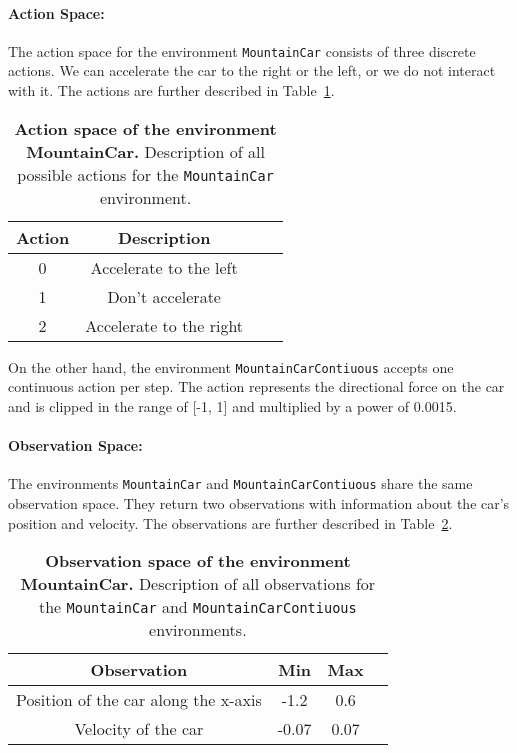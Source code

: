\paragraph*{Action Space:} The action space for the environment \verb|MountainCar| consists of three discrete actions. We can accelerate the car to the right or the left, or we do not interact with it. The actions are further described in Table~\ref{table:mountaincar_act}.
\begin{table}[!ht]
  \centering
  \begin{tabular}{ |c|c|c|c| }
    \hline
    Action & Description \\
    \hline
    0 & Accelerate to the left \\
    1 & Don't accelerate  \\
    2 & Accelerate to the right \\
    \hline
  \end{tabular}
  \caption[Action space of the environment MountainCar]{
    \textbf{Action space of the environment MountainCar.}
    Description of all possible actions for the \texttt{MountainCar} environment.
  }
  \label{table:mountaincar_act}
\end{table}
On the other hand, the environment \verb|MountainCarContiuous| accepts one continuous action per step. The action represents the directional force on the car and is clipped in the range of [-1, 1] and multiplied by a power of 0.0015.

\paragraph*{Observation Space:} The environments \verb|MountainCar| and \verb|MountainCarContiuous| share the same observation space. They return two observations with information about the car's position and velocity. The observations are further described in Table~\ref{table:mountaincar_obs}.
\begin{table}[!ht]
  \centering
  \begin{tabular}{ |c|c|c|c| }
    \hline
    Observation & Min & Max \\
    \hline
    Position of the car along the x-axis & -1.2 & 0.6 \\
    Velocity of the car & -0.07 & 0.07 \\
    \hline
  \end{tabular}
  \caption[Observation space of the environment MountainCar]{
    \textbf{Observation space of the environment MountainCar.}
    Description of all observations for the \texttt{MountainCar} and \texttt{MountainCarContiuous} environments.
  }
  \label{table:mountaincar_obs}
\end{table}

